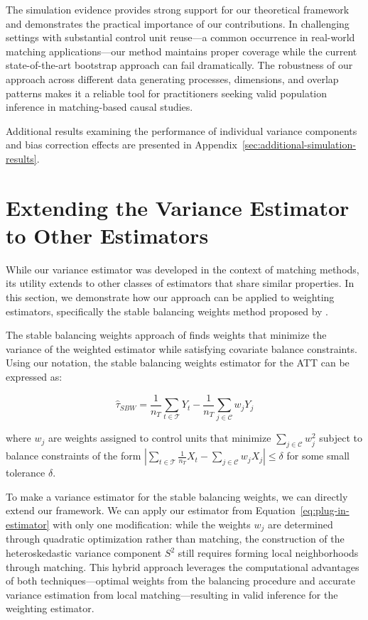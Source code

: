 \documentclass{mytemplate}
\begin{document}
The simulation evidence provides strong support for our theoretical framework and demonstrates the practical importance of our contributions. In challenging settings with substantial control unit reuse—a common occurrence in real-world matching applications—our method maintains proper coverage while the current state-of-the-art bootstrap approach can fail dramatically. The robustness of our approach across different data generating processes, dimensions, and overlap patterns makes it a reliable tool for practitioners seeking valid population inference in matching-based causal studies.

Additional results examining the performance of individual variance components and bias correction effects are presented in Appendix~\ref{sec:additional-simulation-results}.

\section{Extending the Variance Estimator to Other Estimators}
\label{sec:application-to-others}

While our variance estimator was developed in the context of matching methods, its utility extends to other classes of estimators that share similar properties. In this section, we demonstrate how our approach can be applied to weighting estimators, specifically the stable balancing weights method proposed by \cite{zubizarreta2015stable}.

The stable balancing weights approach of \cite{zubizarreta2015stable} finds weights that minimize the variance of the weighted estimator while satisfying covariate balance constraints. Using our notation, the stable balancing weights estimator for the ATT can be expressed as:

\begin{equation}
\hat{\tau}_{SBW} = \frac{1}{n_T} \sum_{t \in \mathcal{T}} Y_t - \frac{1}{n_T} \sum_{j \in \mathcal{C}} w_j Y_j
\end{equation}

where $w_j$ are weights assigned to control units that minimize $\sum_{j \in \mathcal{C}} w_j^2$ subject to balance constraints of the form $\left| \sum_{t \in \mathcal{T}} \frac{1}{n_T} X_t - \sum_{j \in \mathcal{C}} w_j X_j \right| \leq \delta$ for some small tolerance $\delta$.

To make a variance estimator for the stable balancing weights, we can directly extend our framework. We can apply our estimator from Equation~\ref{eq:plug-in-estimator} with only one modification: while the weights $w_j$ are determined through quadratic optimization rather than matching, the construction of the heteroskedastic variance component $S^2$ still requires forming local neighborhoods through matching. This hybrid approach leverages the computational advantages of both techniques—optimal weights from the balancing procedure and accurate variance estimation from local matching—resulting in valid inference for the weighting estimator.
\end{document}
